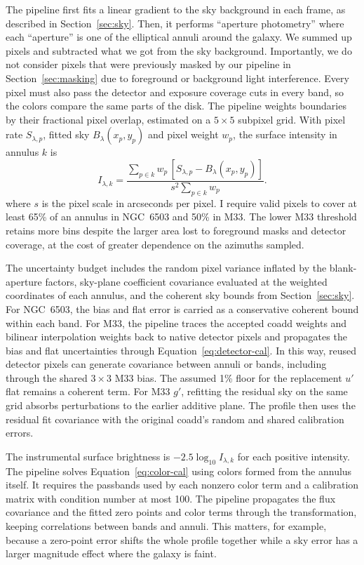 The pipeline first fits a linear gradient to the sky background in each frame, as described in Section~\ref{sec:sky}. Then, it performs ``aperture photometry'' where each ``aperture'' is one of the elliptical annuli around the galaxy. We summed up pixels and subtracted what we got from the sky background. Importantly, we do not consider pixels that were previously masked by our pipeline in Section~\ref{sec:masking} due to foreground or background light interference. Every pixel must also pass the detector and exposure coverage cuts in every band, so the colors compare the same parts of the disk. The pipeline weights boundaries by their fractional pixel overlap, estimated on a $5\times5$ subpixel grid. With pixel rate $S_{\lambda,p}$, fitted sky $B_\lambda(x_p,y_p)$ and pixel weight $w_p$, the surface intensity in annulus $k$ is
\begin{equation}
    I_{\lambda,k} =
    \frac{\sum_{p\in k} w_p\,[S_{\lambda,p}-B_\lambda(x_p,y_p)]}
         {s^2\sum_{p\in k} w_p}.
    \label{eq:annular-photometry}
\end{equation}
where $s$ is the pixel scale in arcseconds per pixel. I require valid pixels to cover at least 65\% of an annulus in NGC~6503 and 50\% in M33. The lower M33 threshold retains more bins despite the larger area lost to foreground masks and detector coverage, at the cost of greater dependence on the azimuths sampled.

The uncertainty budget includes the random pixel variance inflated by the blank-aperture factors, sky-plane coefficient covariance evaluated at the weighted coordinates of each annulus, and the coherent sky bounds from Section~\ref{sec:sky}. For NGC~6503, the bias and flat error is carried as a conservative coherent bound within each band. For M33, the pipeline traces the accepted coadd weights and bilinear interpolation weights back to native detector pixels and propagates the bias and flat uncertainties through Equation~\ref{eq:detector-cal}. In this way, reused detector pixels can generate covariance between annuli or bands, including through the shared $3\times3$ M33 bias. The assumed 1\% floor for the replacement $u'$ flat remains a coherent term. For M33 $g'$, refitting the residual sky on the same grid absorbs perturbations to the earlier additive plane. The profile then uses the residual fit covariance with the original coadd's random and shared calibration errors.

The instrumental surface brightness is $-2.5\log_{10}I_{\lambda,k}$ for each positive intensity. The pipeline solves Equation~\ref{eq:color-cal} using colors formed from the annulus itself. It requires the passbands used by each nonzero color term and a calibration matrix with condition number at most 100. The pipeline propagates the flux covariance and the fitted zero points and color terms through the transformation, keeping correlations between bands and annuli. This matters, for example, because a zero-point error shifts the whole profile together while a sky error has a larger magnitude effect where the galaxy is faint.

